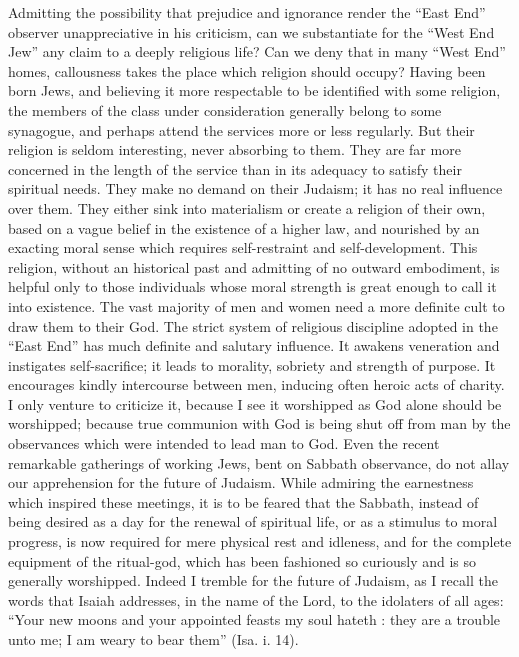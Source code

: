 Admitting the possibility that prejudice and ignorance 
render the ``East End'' observer unappreciative in his 
criticism, can we substantiate for the ``West End Jew'' 
any claim to a deeply religious life? Can we deny that 
in many ``West End'' homes, callousness takes the place 
which religion should occupy? Having been born Jews, 
and believing it more respectable to be identified with 
some religion, the members of the class under consideration 
generally belong to some synagogue, and perhaps attend the 
services more or less regularly. But their religion is seldom 
interesting, never absorbing to them. They are far more 
concerned in the length of the service than in its adequacy 
to satisfy their spiritual needs. They make no demand on 
their Judaism; it has no real influence over them. They 
either sink into materialism or create a religion of their 
own, based on a vague belief in the existence of a higher 
law, and nourished by an exacting moral sense which 
requires self-restraint and self-development. This religion, 
without an historical past and admitting of no outward 
embodiment, is helpful only to those individuals whose 
moral strength is great enough to call it into existence. 
The vast majority of men and women need a more definite 
cult to draw them to their God. The strict system of 
religious discipline adopted in the ``East End'' has much 
definite and salutary influence. It awakens veneration 
and instigates self-sacrifice; it leads to morality, sobriety 
and strength of purpose. It encourages kindly intercourse 
between men, inducing often heroic acts of charity. I only 
venture to criticize it, because I see it worshipped as God 
alone should be worshipped; because true communion with 
God is being shut off from man by the observances which 
were intended to lead man to God. Even the recent 
remarkable gatherings of working Jews, bent on Sabbath 
observance, do not allay our apprehension for the future 
of Judaism. While admiring the earnestness which inspired 
these meetings, it is to be feared that the Sabbath, instead 
of being desired as a day for the renewal of spiritual life, or 
as a stimulus to moral progress, is now required for mere 
physical rest and idleness, and for the complete equipment 
of the ritual-god, which has been fashioned so curiously 
and is so generally worshipped. Indeed I tremble for 
the future of Judaism, as I recall the words that Isaiah 
addresses, in the name of the Lord, to the idolaters of all 
ages: ``Your new moons and your appointed feasts my 
soul hateth : they are a trouble unto me; I am weary to 
bear them'' (Isa. i. 14). 

